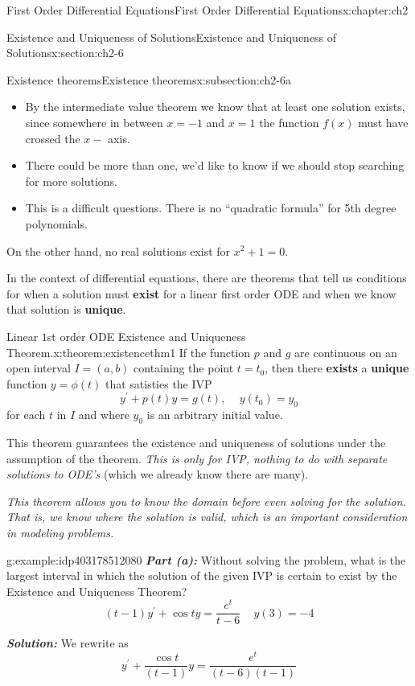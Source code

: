\documentclass[oneside,10pt,]{book}
\newcommand{\alert}[1]{\textbf{\textit{#1}}}
\newcommand{\terminology}[1]{\textbf{#1}}
\numberwithin{equation}{section}
\numberwithin{equation}{section}
\begin{document}
\begin{chapterptx}{First Order Differential Equations}{}{First Order Differential Equations}{}{}{x:chapter:ch2}
\begin{sectionptx}{Existence and Uniqueness of Solutions}{}{Existence and Uniqueness of Solutions}{}{}{x:section:ch2-6}
\begin{subsectionptx}{Existence theorems}{}{Existence theorems}{}{}{x:subsection:ch2-6a}
\begin{itemize}[label=\textbullet]
\item{}By the intermediate value theorem we know that at least one solution exists, since somewhere in between \(x=-1\) and \(x=1\) the function \(f(x)\) must have crossed the \(x-\) axis.%
\item{}There could be more than one, we'd like to know if we should stop searching for more solutions.%
\item{}This is a difficult questions. There is no ``quadratic formula'' for 5th degree polynomials.%
\end{itemize}
On the other hand, no real solutions exist for \(x^{2}+1=0\).%
\par
In the context of differential equations, there are theorems that tell us conditions for when a solution must \terminology{exist} for a linear first order ODE and when we know that solution is \terminology{unique}.%
\begin{theorem}{Linear \(1\)st order ODE Existence and Uniqueness Theorem.}{}{x:theorem:existencethm1}%
If the function \(p\) and \(g\) are continuous on an open interval \(I=(a,b)\)      containing the point \(t=t_{0}\), then there \terminology{exists} a \terminology{unique} function \(y=\phi(t)\) that satisties the IVP%
\begin{equation*}
y^{\prime}+p(t)y=g(t),\,\,\,\,\,\,\,y(t_{0})=y_{0}
\end{equation*}
for each \(t\) in \(I\) and where \(y_{0}\) is an arbitrary initial value.%
\end{theorem}
This theorem guarantees the existence and uniqueness of solutions under the assumption of the theorem. \emph{This is only for IVP, nothing to do with separate solutions to ODE's} (which we already know there are many).%
\par
\emph{This theorem allows you to know the domain before even solving for the solution. That is, we know where the solution is valid, which is an important consideration in modeling problems.}%
\begin{example}{}{g:example:idp403178512080}%
\alert{Part (a):} Without solving the problem, what is the largest interval in which the solution of the given IVP is certain to exist by the Existence and Uniqueness Theorem?%
\begin{equation*}
(t-1)y^{\prime}+\cos ty=\frac{e^{t}}{t-6}\,\,\,\,\,\,\,y(3)=-4
\end{equation*}
%
\par
\alert{Solution:} We rewrite as%
\begin{equation*}
y^{\prime}+\frac{\cos t}{(t-1)}y=\frac{e^{t}}{\left(t-6\right)(t-1)}

\end{equation*}
\end{example}
\end{subsectionptx}
\end{sectionptx}
\end{chapterptx}
\end{document}
